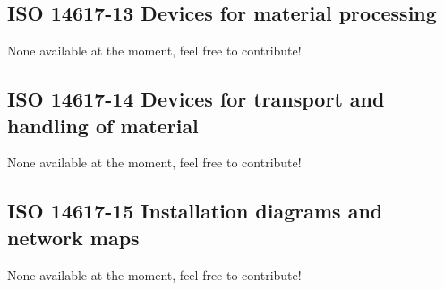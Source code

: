 \documentclass[a4paper]{article}
\begin{document}
\subsection{ISO 14617-13 Devices for material processing}
None available at the moment, feel free to contribute!

\subsection{ISO 14617-14 Devices for transport and handling of material}
None available at the moment, feel free to contribute!


\subsection{ISO 14617-15 Installation diagrams and network maps}
None available at the moment, feel free to contribute!
\end{document}
